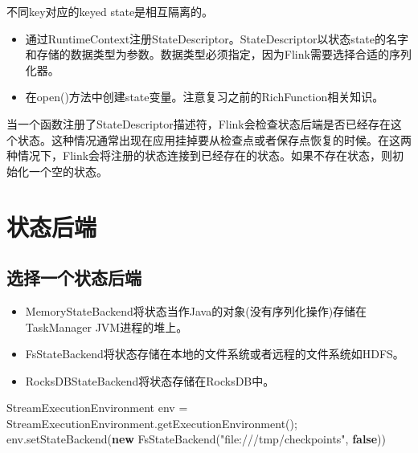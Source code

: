 \documentclass[cn,11pt,chinese]{elegantbook}
\newenvironment{Shaded}{}{}
\newcommand{\FunctionTok}[1]{\textcolor[rgb]{0.02,0.16,0.49}{#1}}
\newcommand{\KeywordTok}[1]{\textcolor[rgb]{0.00,0.44,0.13}{\textbf{#1}}}
\newcommand{\NormalTok}[1]{#1}
\newcommand{\StringTok}[1]{\textcolor[rgb]{0.25,0.44,0.63}{#1}}
\providecommand{\tightlist}{%
  \setlength{\itemsep}{0pt}\setlength{\parskip}{0pt}}
\renewenvironment{quote}{\begin{customblockquote}\list{}{\rightmargin=0em\leftmargin=0em}%
\item\relax\color{blockquote-text}\ignorespaces}{\unskip\unskip\endlist\end{customblockquote}}
\begin{document}
\begin{quote}
不同key对应的keyed state是相互隔离的。
\end{quote}

\begin{itemize}
\tightlist
\item
  通过RuntimeContext注册StateDescriptor。StateDescriptor以状态state的名字和存储的数据类型为参数。数据类型必须指定，因为Flink需要选择合适的序列化器。
\item
  在open()方法中创建state变量。注意复习之前的RichFunction相关知识。
\end{itemize}

当一个函数注册了StateDescriptor描述符，Flink会检查状态后端是否已经存在这个状态。这种情况通常出现在应用挂掉要从检查点或者保存点恢复的时候。在这两种情况下，Flink会将注册的状态连接到已经存在的状态。如果不存在状态，则初始化一个空的状态。

\hypertarget{ux72b6ux6001ux540eux7aef-1}{%
\section{状态后端}\label{ux72b6ux6001ux540eux7aef-1}}

\hypertarget{ux9009ux62e9ux4e00ux4e2aux72b6ux6001ux540eux7aef}{%
\subsection{选择一个状态后端}\label{ux9009ux62e9ux4e00ux4e2aux72b6ux6001ux540eux7aef}}

\begin{itemize}
\tightlist
\item
  MemoryStateBackend将状态当作Java的对象(没有序列化操作)存储在TaskManager
  JVM进程的堆上。
\item
  FsStateBackend将状态存储在本地的文件系统或者远程的文件系统如HDFS。
\item
  RocksDBStateBackend将状态存储在RocksDB中。
\end{itemize}

\begin{Shaded}
\begin{Highlighting}[]
\NormalTok{StreamExecutionEnvironment env = StreamExecutionEnvironment.}\FunctionTok{getExecutionEnvironment}\NormalTok{();}
\NormalTok{env.}\FunctionTok{setStateBackend}\NormalTok{(}\KeywordTok{new} \FunctionTok{FsStateBackend}\NormalTok{(}\StringTok{"file:///tmp/checkpoints"}\NormalTok{, }\KeywordTok{false}\NormalTok{))}
\end{Highlighting}
\end{Shaded}
\end{document}

